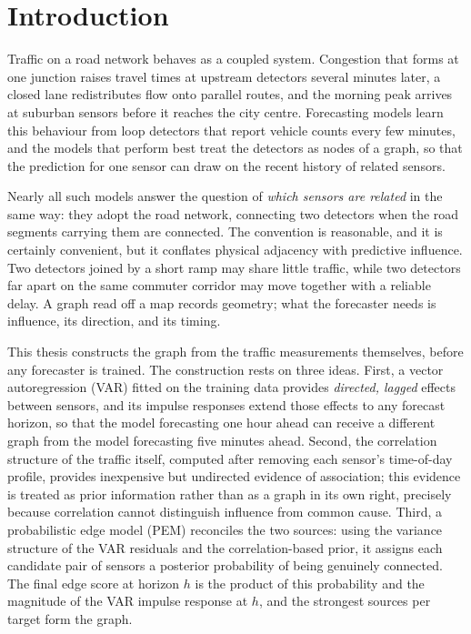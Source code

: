 \documentclass[MTech]{ugthesis}
\begin{document}

\chapter{Introduction}
\label{chap:intro}

Traffic on a road network behaves as a coupled system. Congestion that forms at one junction raises travel times at upstream detectors several minutes later, a closed lane redistributes flow onto parallel routes, and the morning peak arrives at suburban sensors before it reaches the city centre. Forecasting models learn this behaviour from loop detectors that report vehicle counts every few minutes, and the models that perform best treat the detectors as nodes of a graph, so that the prediction for one sensor can draw on the recent history of related sensors.

Nearly all such models answer the question of \emph{which sensors are related} in the same way: they adopt the road network, connecting two detectors when the road segments carrying them are connected. The convention is reasonable, and it is certainly convenient, but it conflates physical adjacency with predictive influence. Two detectors joined by a short ramp may share little traffic, while two detectors far apart on the same commuter corridor may move together with a reliable delay. A graph read off a map records geometry; what the forecaster needs is influence, its direction, and its timing.

This thesis constructs the graph from the traffic measurements themselves, before any forecaster is trained. The construction rests on three ideas. First, a vector autoregression (VAR) fitted on the training data provides \emph{directed, lagged} effects between sensors, and its impulse responses extend those effects to any forecast horizon, so that the model forecasting one hour ahead can receive a different graph from the model forecasting five minutes ahead. Second, the correlation structure of the traffic itself, computed after removing each sensor's time-of-day profile, provides inexpensive but undirected evidence of association; this evidence is treated as prior information rather than as a graph in its own right, precisely because correlation cannot distinguish influence from common cause. Third, a probabilistic edge model (PEM) reconciles the two sources: using the variance structure of the VAR residuals and the correlation-based prior, it assigns each candidate pair of sensors a posterior probability of being genuinely connected. The final edge score at horizon $h$ is the product of this probability and the magnitude of the VAR impulse response at $h$, and the strongest sources per target form the graph.
\end{document}
